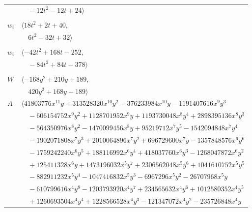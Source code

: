 \documentclass[11pt]{article}
\begin{document}
\begin{longtable}{@{}ll@{}}
 & $\quad -12t^{2}-12t+24\rangle$\\
\addlinespace[2pt]
\multicolumn{2}{@{}p{0.97\textwidth}@{}}{$i=6$, $D_i=2$, $\rho_{ij}$: $2{:}1, \allowbreak 20{:}1, \allowbreak 29{:}1, \allowbreak 30{:}2, \allowbreak 38{:}2, \allowbreak 41{:}1, \allowbreak 42{:}2$}\\
$w_i$ & $\langle 18t^{2}+2t+40,$\\
 & $\quad 6t^{2}-32t+32\rangle$\\
\addlinespace[2pt]
\multicolumn{2}{@{}p{0.97\textwidth}@{}}{$i=7$, $D_i=6$, $\rho_{ij}$: $1{:}1, \allowbreak 3{:}2, \allowbreak 25{:}2, \allowbreak 26{:}2, \allowbreak 27{:}2, \allowbreak 28{:}2, \allowbreak 38{:}1, \allowbreak 40{:}2$}\\
$w_i$ & $\langle -42t^{2}+168t-252,$\\
 & $\quad -84t^{2}+84t-378\rangle$\\
\addlinespace[2pt]
\multicolumn{2}{@{}p{0.97\textwidth}@{}}{$i=8$, $D_i=48$, $\rho_{ij}$: $0{:}1, \allowbreak 17{:}2, \allowbreak 21{:}1, \allowbreak 22{:}1, \allowbreak 26{:}2, \allowbreak 30{:}2, \allowbreak 31{:}2, \allowbreak 32{:}1, \allowbreak 34{:}1, \allowbreak 37{:}1, \allowbreak 38{:}2$}\\
$W$ & $\langle -168y^{2}+210y+189,$\\
 & $\quad 420y^{2}+168y-189\rangle$\\
$A$ & $\langle 41803776x^{11}y+313528320x^{10}y^{2}-376233984x^{10}y-1191407616x^{9}y^{3}$\\
 & $\quad -606154752x^{9}y^{2}+1128701952x^{9}y+1193730048x^{8}y^{4}+2898395136x^{8}y^{3}$\\
 & $\quad -564350976x^{8}y^{2}-1470099456x^{8}y+95219712x^{7}y^{5}-1542094848x^{7}y^{4}$\\
 & $\quad -1902071808x^{7}y^{3}+2010064896x^{7}y^{2}+696729600x^{7}y-1357848576x^{6}y^{6}$\\
 & $\quad -1759242240x^{6}y^{5}+188116992x^{6}y^{4}+418037760x^{6}y^{3}-1268047872x^{6}y^{2}$\\
 & $\quad +125411328x^{6}y+1473196032x^{5}y^{7}+2306562048x^{5}y^{6}+1041610752x^{5}y^{5}$\\
 & $\quad -882911232x^{5}y^{4}-1047416832x^{5}y^{3}-6967296x^{5}y^{2}-26707968x^{5}y$\\
 & $\quad -610799616x^{4}y^{8}-1203793920x^{4}y^{7}+234565632x^{4}y^{6}+1012580352x^{4}y^{5}$\\
 & $\quad +1260693504x^{4}y^{4}+1228566528x^{4}y^{3}-121347072x^{4}y^{2}-235726848x^{4}y$\\

\end{longtable}
\end{document}
